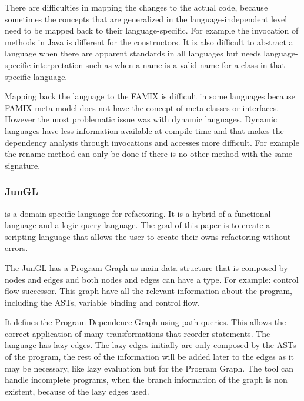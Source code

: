 There are difficulties in mapping the changes to the actual code, because sometimes the concepts that are generalized in the language-independent level need to be mapped back to their language-specific.
For example the invocation of methods in Java is different for the constructors.
It is also difficult to abstract a language when there are apparent standards in all languages but needs language-specific interpretation such as when a name is a valid name for a class in that specific language.

Mapping back the language to the FAMIX is difficult in some languages because FAMIX meta-model does not have the concept of meta-classes or interfaces.
However the most problematic issue was with dynamic languages. 
Dynamic languages have less information available at compile-time and that makes the dependency analysis  through invocations and accesses more difficult. 
For example the rename method can only be done if there is no other method with the same signature.

\subsubsection{JunGL} %


\cite{verbaere2006jungl} is a domain-specific language for refactoring. 
It is a hybrid of a functional language and a logic query language. 
The goal of this paper is to create a scripting language that allows the user to create their owns refactoring without errors.

The JunGL has a Program Graph as main data structure that is composed by nodes and edges and both nodes and edges can have a type. 
For example: control flow successor. 
This graph have all the relevant information about the program, including the ASTs, variable binding and control flow.

It defines the Program Dependence Graph using path queries. 
This allows the correct application of many transformations that reorder statements.
The language has lazy edges. 
The lazy edges initially are only composed by the ASTs of the program, the rest of the information will be added later to the edges as it may be necessary, like lazy evaluation but for the Program Graph.
The tool can handle incomplete programs, when the branch information of the graph is non existent, because of the lazy edges used. 


